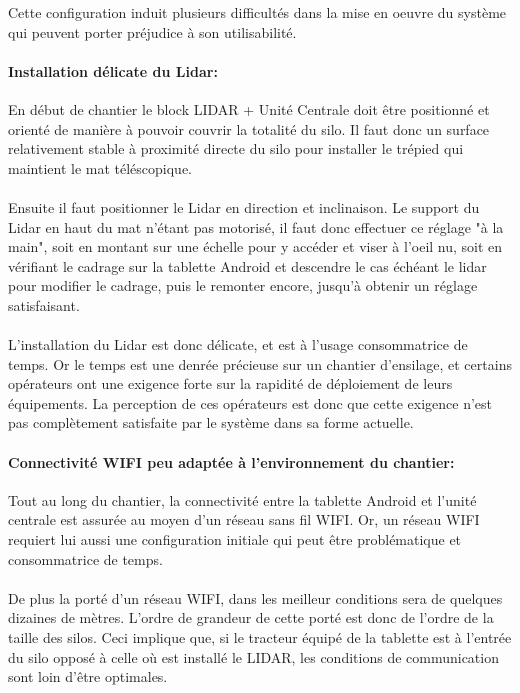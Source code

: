 \documentclass[12pt,a4paper]{report}
\begin{document}
Cette configuration induit plusieurs difficultés dans la mise en oeuvre du système qui peuvent porter préjudice à son utilisabilité.

\paragraph{Installation délicate du Lidar:} En début de chantier le block LIDAR + Unité Centrale doit être positionné et orienté de manière à pouvoir couvrir la totalité du silo. Il faut donc un surface relativement stable à proximité directe du silo pour installer le trépied qui maintient le mat téléscopique.

\paragraph{} Ensuite il faut positionner le Lidar en direction et inclinaison. Le support du Lidar en haut du mat n'étant pas motorisé, il faut donc effectuer ce réglage "à la main", soit en montant sur une échelle pour y accéder et viser à l'oeil nu, soit en vérifiant le cadrage sur la tablette Android et descendre le cas échéant le lidar pour modifier le cadrage, puis le remonter encore, jusqu'à obtenir un réglage satisfaisant.

\paragraph{} L'installation du Lidar est donc délicate, et est à l'usage consommatrice de temps. Or le temps est une denrée précieuse sur un chantier d'ensilage, et certains opérateurs ont une exigence forte sur la rapidité de déploiement de leurs équipements. La perception de ces opérateurs est donc que cette exigence n'est pas complètement satisfaite par le système dans sa forme actuelle.


\paragraph{Connectivité WIFI peu adaptée à l'environnement du chantier: } Tout au long du chantier, la connectivité entre la tablette Android et l'unité centrale est assurée au moyen d'un réseau sans fil WIFI. Or, un réseau WIFI requiert lui aussi une configuration initiale qui peut être problématique et consommatrice de temps.

\paragraph{} De plus la porté d'un réseau WIFI, dans les meilleur conditions sera de quelques dizaines de mètres. L'ordre de grandeur de cette porté est donc de l'ordre de la taille des silos. Ceci implique que, si le tracteur équipé de la tablette est à l'entrée du silo opposé à celle où est installé le LIDAR, les conditions de communication sont loin d'être optimales.
\end{document}
